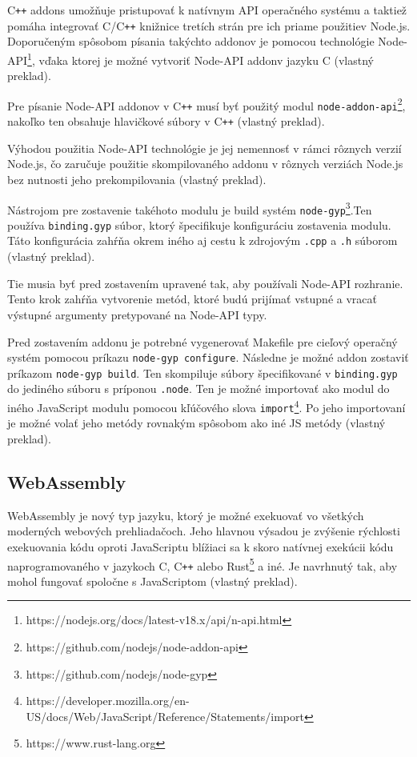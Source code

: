 C\texttt{++} addons umožňuje pristupovať k natívnym API operačného systému a taktiež pomáha integrovať C/C\texttt{++} knižnice tretích strán pre ich priame použitie\newline v Node.js. Doporučeným spôsobom písania takýchto addonov je pomocou technológie Node-API\footnote{https://nodejs.org/docs/latest-v18.x/api/n-api.html}, vďaka ktorej je možné vytvoriť Node-API addon\newline v jazyku C \cite{cpp_addons} (vlastný preklad).

Pre písanie Node-API addonov v C\texttt{++} musí byť použitý modul \texttt{node-addon-api}\footnote{https://github.com/nodejs/node-addon-api}, nakoľko ten obsahuje hlavičkové súbory v C\texttt{++} \cite{cpp_addons} (vlastný preklad).

Výhodou použitia Node-API technológie je jej nemennosť v rámci rôznych verzií Node.js, čo zaručuje použitie skompilovaného addonu v rôznych verziách Node.js bez nutnosti jeho prekompilovania \cite{cpp_addons} (vlastný preklad).

Nástrojom pre zostavenie takéhoto modulu je build systém \texttt{node-gyp}\footnote{https://github.com/nodejs/node-gyp}.\newline Ten používa \texttt{binding.gyp} súbor, ktorý špecifikuje konfiguráciu zostavenia modulu. Táto konfigurácia zahŕňa okrem iného aj cestu k zdrojovým \texttt{.cpp} a \texttt{.h} súborom  \cite{cpp_addons} (vlastný preklad).

Tie musia byť pred zostavením upravené tak, aby používali Node-API rozhranie. Tento krok zahŕňa vytvorenie metód, ktoré budú prijímať vstupné a vracať výstupné argumenty pretypované na Node-API typy.

Pred zostavením addonu je potrebné vygenerovať Makefile pre cieľový operačný systém pomocou príkazu \texttt{node-gyp configure}. Následne je možné addon zostaviť príkazom \texttt{node-gyp build}. Ten skompiluje súbory špecifikované v \texttt{binding.gyp} do jediného súboru s príponou \texttt{.node}. Ten je možné importovať ako modul do iného JavaScript modulu pomocou kľúčového slova \texttt{import}\footnote{https://developer.mozilla.org/en-US/docs/Web/JavaScript/Reference/Statements/import}. Po jeho importovaní je možné volať jeho metódy rovnakým spôsobom ako iné JS metódy \cite{cpp_addons} (vlastný preklad).

\subsection {WebAssembly}
WebAssembly je nový typ jazyku, ktorý je možné exekuovať vo všetkých moderných webových prehliadačoch. Jeho hlavnou výsadou je zvýšenie rýchlosti exekuovania kódu oproti JavaScriptu blížiaci sa k skoro natívnej exekúcii kódu naprogramovaného v jazykoch C, C\texttt{++} alebo Rust\footnote{https://www.rust-lang.org} a iné. Je navrhnutý tak, aby mohol fungovať spoločne s JavaScriptom \cite{webassembly_concepts} (vlastný preklad).

